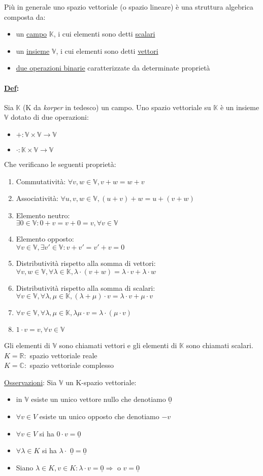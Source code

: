 \documentclass{article}
\newcommand{\ul}[1]{\underline{#1}}
\newcommand{\K}{\mathbb{K}}
\newcommand{\R}{\mathbb{R}}
\newcommand{\V}{\mathbb{V}}
\newcommand{\Def}[2]{\paragraph{\ul{Def}:}#1\\\hspace*{3em}\begin{minipage}{.8\textwidth}#2\end{minipage}}
\begin{document}
	Più in generale uno spazio vettoriale (o spazio lineare) è una struttura algebrica composta da:
	\begin{itemize}
		\item un \ul{campo} $\K$, i cui elementi sono detti \ul{scalari}
		\item un \ul{insieme} $\V$, i cui elementi sono detti \ul{vettori}
		\item \ul{due operazioni binarie} caratterizzate da determinate proprietà
	\end{itemize}
	\Def{Sia $\K$ (K da \textit{korper} in tedesco) un campo. Uno spazio vettoriale su $\K$ è un insieme $\V$ dotato di due operazioni:}{
		\begin{itemize}
			\item $+:\V\times\V\rightarrow\V$
			\item $\cdot:\K\times\V\rightarrow\V$
		\end{itemize}
		Che verificano le seguenti proprietà:
		\begin{enumerate}
			\item Commutatività: $\forall v,w\in\V, v+w=w+v$
			\item Associatività: $\forall u,v,w\in\V,(u+v)+w=u+(v+w)$
			\item Elemento neutro:\\$\exists0\in\V:0+v=v+0=v,\forall v\in\V$
			\item Elemento opposto:\\$\forall v\in\V,\exists v'\in\V:v+v'=v'+v=0$
			\item Distributività rispetto alla somma di vettori:\\$\forall v,w\in\V,\forall\lambda\in\K,\lambda\cdot(v+w)=\lambda\cdot v+\lambda\cdot w$
			\item Distributività rispetto alla somma di scalari:\\$\forall v\in\V,\forall\lambda,\mu\in\K,(\lambda+\mu)\cdot v=\lambda\cdot v+\mu\cdot v$
			\item $\forall v\in\V,\forall\lambda,\mu\in\K,\lambda\mu\cdot v=\lambda\cdot(\mu\cdot v)$
			\item $1\cdot v=v,\forall v\in\V$
		\end{enumerate}
		Gli elementi di $\V$ sono chiamati vettori e gli elementi di $\K$ sono chiamati scalari.\\
		$K=\R:$ spazio vettoriale reale\\
		$K=\mathbb{C}:$ spazio vettoriale complesso

		\ul{Osservazioni}: Sia $\V$ un K-spazio vettoriale:
		\begin{itemize}
			\item in $\V$ esiste un unico vettore nullo che denotiamo $\ul{0}$
			\item $\forall v\in V$ esiste un unico opposto che denotiamo $-v$
			\item $\forall v\in V$ si ha $0\cdot v=\ul{0}$
			\item $\forall\lambda\in K$ si ha $\lambda\cdot$ $\ul{0}=\ul{0}$
			\item Siano $\lambda\in K,v\in K:\lambda\cdot v=\ul{0}\Rightarrow$ o $v=\ul{0}$
		\end{itemize}
	}
\end{document}
